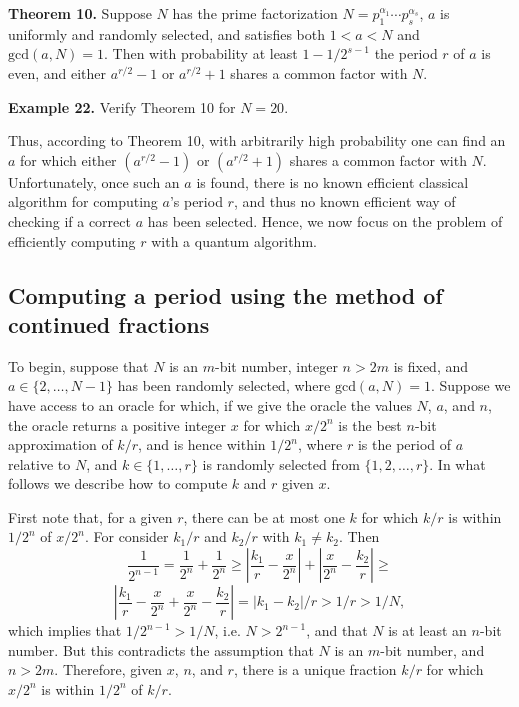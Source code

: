 \documentclass [12pt]{article}
\theoremstyle{definition}
\begin{document}
\textbf{Theorem 10.} Suppose $N$ has the prime factorization $N=p_1^{\alpha_1}\cdots p_s^{\alpha_s}$, $a$ is uniformly and randomly selected, and satisfies both $1 < a < N$ and 
$\mbox{gcd}(a,N)=1$.
Then with probability at least $1-1/2^{s-1}$ the period $r$ of $a$ is even, and either 
 $a^{r/2}-1$ or  $a^{r/2}+1$ shares a common factor with $N$.
 
\newpage
\textbf{Example 22.} Verify Theorem 10 for $N=20$. 


\newpage

Thus, according to Theorem 10, with arbitrarily high probability one can  find an $a$ for which either $(a^{r/2}-1)$ or $(a^{r/2}+1)$ shares a common factor with $N$. Unfortunately, once such an
$a$ is found, there is no known efficient classical algorithm for computing $a$'s period $r$, and thus no known efficient way of checking if a correct $a$ has been selected.
Hence, we now focus on the problem of efficiently computing $r$ with a quantum algorithm.

\subsection*{Computing a period using the method of continued fractions}

To begin, suppose that $N$ is an $m$-bit number, integer $n > 2m$ is fixed, and $a\in \{2,\ldots,N-1\}$ has been randomly selected, where $\mbox{gcd}(a,N)=1$. 
Suppose we have access to an oracle
for which, if we give the oracle the values $N$, $a$, and $n$, the oracle returns a positive integer $x$ for which $x/2^n$ is the best $n$-bit approximation of $k/r$,
and is hence within $1/2^n$, where 
$r$ is the period of $a$ relative to $N$, and $k\in\{1,\ldots,r\}$ is randomly selected from $\{1,2,\ldots,r\}$. In what follows we describe how to 
compute $k$ and $r$ given $x$.

First note that, for a given $r$, there can be at most one $k$ for which $k/r$ is within $1/2^n$ of $x/2^n$. For consider $k_1/r$ and $k_2/r$ with $k_1 \not= k_2$. Then 
\[\frac{1}{2^{n-1}} = \frac{1}{2^n} + \frac{1}{2^n} \geq |\frac{k_1}{r} - \frac{x}{2^n}| + |\frac{x}{2^n}-\frac{k_2}{r}| \geq \]
\[|\frac{k_1}{r} - \frac{x}{2^n} + \frac{x}{2^n}-\frac{k_2}{r}| = |k_1-k_2|/r > 1/r > 1/N,\]
which implies that $1/2^{n-1} > 1/N$, i.e. $N > 2^{n-1}$, and that $N$ is at least an $n$-bit number. But this contradicts the assumption that 
$N$ is an $m$-bit number, and $n > 2m$.
Therefore, given $x$, $n$, and $r$, there is a unique fraction $k/r$ for which $x/2^n$ is within $1/2^n$ of $k/r$.
\end{document}
